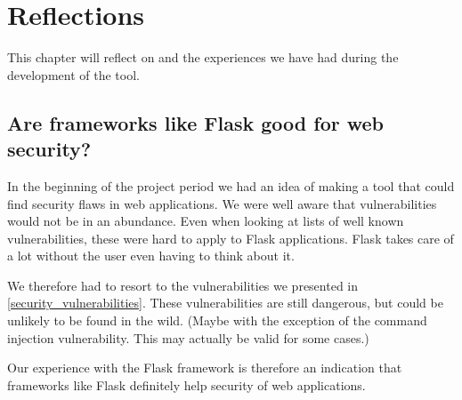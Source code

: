 \section{Reflections}
This chapter will reflect on \pyt{} and the experiences we have had during the development of the tool.

\subsection{Are frameworks like Flask good for web security?}
In the beginning of the project period we had an idea of making a tool that could find security flaws in web applications.
We were well aware that vulnerabilities would not be in an abundance.
Even when looking at lists of well known vulnerabilities, these were hard to apply to Flask applications.
Flask takes care of a lot without the user even having to think about it.

We therefore had to resort to the vulnerabilities we presented in \cref{security_vulnerabilities}.
These vulnerabilities are still dangerous, but could be unlikely to be found in the wild. (Maybe with the exception of the command injection vulnerability. This may actually be valid for some cases.)

Our experience with the Flask framework is therefore an indication that frameworks like Flask definitely help security of web applications.
